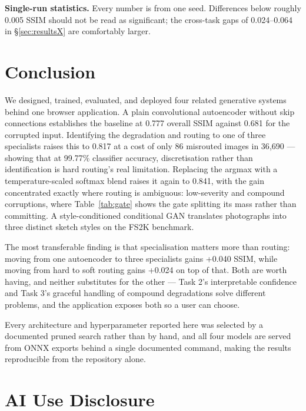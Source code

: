 \documentclass[journal]{IEEEtran}
\begin{document}
\textbf{Single-run statistics.} Every number is from one seed. Differences below roughly 0.005 SSIM should not be read as significant; the cross-task gaps of 0.024--0.064 in \S\ref{sec:resultsX} are comfortably larger.

\section{Conclusion}
\label{sec:concl}

We designed, trained, evaluated, and deployed four related generative systems behind one browser application. A plain convolutional autoencoder without skip connections establishes the baseline at 0.777 overall SSIM against 0.681 for the corrupted input. Identifying the degradation and routing to one of three specialists raises this to 0.817 at a cost of only 86 misrouted images in 36{,}690 --- showing that at 99.77\% classifier accuracy, discretisation rather than identification is hard routing's real limitation. Replacing the argmax with a temperature-scaled softmax blend raises it again to 0.841, with the gain concentrated exactly where routing is ambiguous: low-severity and compound corruptions, where Table~\ref{tab:gate} shows the gate splitting its mass rather than committing. A style-conditioned conditional GAN translates photographs into three distinct sketch styles on the FS2K benchmark.

The most transferable finding is that specialisation matters more than routing: moving from one autoencoder to three specialists gains +0.040 SSIM, while moving from hard to soft routing gains +0.024 on top of that. Both are worth having, and neither substitutes for the other --- Task 2's interpretable confidence and Task 3's graceful handling of compound degradations solve different problems, and the application exposes both so a user can choose.

Every architecture and hyperparameter reported here was selected by a documented pruned search rather than by hand, and all four models are served from ONNX exports behind a single documented command, making the results reproducible from the repository alone.

\appendix
\section{AI Use Disclosure}
\label{sec:ai}
\end{document}
